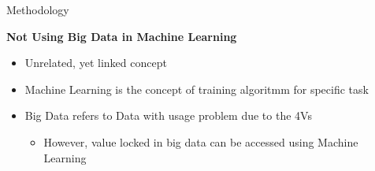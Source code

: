 \begin{frame}[label=metho]{Methodology}
	
	\textbf{Not Using Big Data in Machine Learning}
	\begin{itemize}
		\item Unrelated, yet linked concept
		\item Machine Learning is the concept of training algoritmm for specific task
		\item Big Data refers to Data with usage problem due to the 4Vs
		\begin{itemize}
			\item However, value locked in big data can be accessed using Machine Learning
		\end{itemize}	
	\end{itemize}
	
	
\end{frame}






